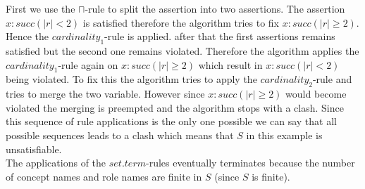 \documentclass[a4paper,11pt]{scrartcl}
\theoremstyle{break}
\theoremstyle{definition}
\begin{document}
First we use the $\sqcap$-rule to split the assertion into two assertions. The assertion $x:succ(|r|<2)$ is satisfied therefore the algorithm tries to fix $x:succ(|r|\geq 2)$. Hence the $cardinality_1$-rule is applied. after that the first assertions remains satisfied but the second one remains violated. Therefore the algorithm applies the $cardinality_1$-rule again on $x:succ(|r|\geq 2)$ which result in $x:succ(|r|<2)$ being violated. To fix this the algorithm tries to apply the $cardinality_2$-rule and tries to merge the two variable. However since $x:succ(|r|\geq 2)$ would become violated the merging is preempted and the algorithm stops with a clash. Since this sequence of rule applications is the only one possible we can say that all possible sequences leads to a clash which means that $S$ in this example is unsatisfiable.\\
The applications of the $set.term$-rules eventually terminates because the number of concept names and role names are finite in $S$ (since $S$ is finite).
\iffalse
\end{document}
